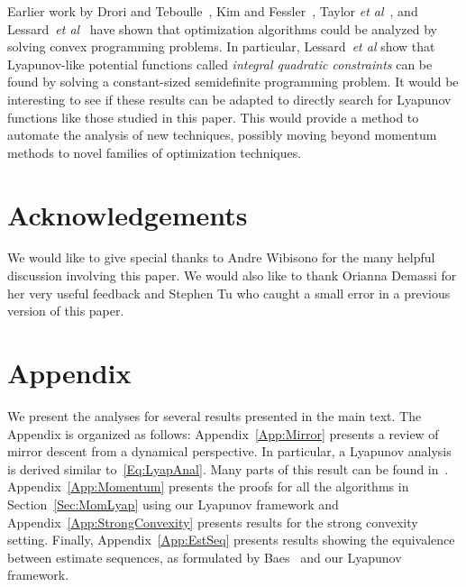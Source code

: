\documentclass[11pt]{article}
\theoremstyle{plain}
\begin{document}
Earlier work by Drori and Teboulle~\cite{DroriTeboulle13}, Kim and Fessler~\cite{Kim2016}, Taylor \emph{et al}~\cite{Taylor2016}, and Lessard~\emph{et al}~\cite{Lessard14} have shown that optimization algorithms could be analyzed by solving convex programming problems.  In particular, Lessard~\emph{et al} show that Lyapunov-like potential functions called \emph{integral quadratic constraints} can be found by solving a constant-sized semidefinite programming problem. It would be interesting to see if these results can be adapted to directly search for Lyapunov functions like those studied in this paper.  This would provide a method to automate the analysis of new techniques, possibly moving beyond momentum methods to novel families of optimization techniques.

\section*{Acknowledgements}
We would like to give special thanks to Andre Wibisono for the many helpful discussion involving this paper. We would also like to thank Orianna Demassi for her very useful feedback and Stephen Tu who caught a small error in a previous version of this paper.



\clearpage
\appendix
\section*{Appendix}
We present the analyses for several results presented in the main text. The Appendix is organized as follows: Appendix~\ref{App:Mirror} presents a review of mirror descent from a dynamical perspective. In particular,  a Lyapunov analysis is derived similar to~\eqref{Eq:LyapAnal}. Many parts of this result can be found in~\cite{NemirovskiiYudin}. Appendix~\ref{App:Momentum} presents the proofs for all the algorithms in Section~\ref{Sec:MomLyap} using our Lyapunov framework and Appendix~\ref{App:StrongConvexity} presents results for the strong convexity setting. Finally, Appendix~\ref{App:EstSeq} presents results showing the equivalence between estimate sequences, as formulated by Baes~\cite{Baes09} and our Lyapunov framework. 
\end{document}
